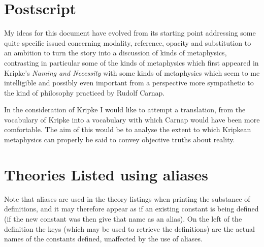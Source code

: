 
\section{Postscript}\label{POSTSCRIPT}

My ideas for this document have evolved from its starting point addressing some quite specific issued concerning modality, reference, opacity and substitution to an ambition to turn the story into a discussion of kinds of metaphysics, contrasting in particular some of the kinds of metaphysics which first appeared in Kripke's \emph{Naming and Necessity} with some kinds of metaphysics which seem to me intelligible and possibly even important from a perspective more sympathetic to the kind of philosophy practiced by Rudolf Carnap.

In the consideration of Kripke I would like to attempt a translation, from the vocabulary of Kripke into a vocabulary with which Carnap would have been more comfortable.
The aim of this would be to analyse the extent to which Kripkean metaphysics can properly be said to convey objective truths about reality.

\appendix

\vfill

\section{Theories Listed using aliases}\label{TheoryListings}

Note that aliases are used in the theory listings when printing the substance of definitions, and it may therefore appear as if an existing constant is being defined (if the new constant was then give that name as an alias).
On the left of the definition the keys (which may be used to retrieve the definitions) are the actual names of the constants defined, unaffected by the use of aliases.

